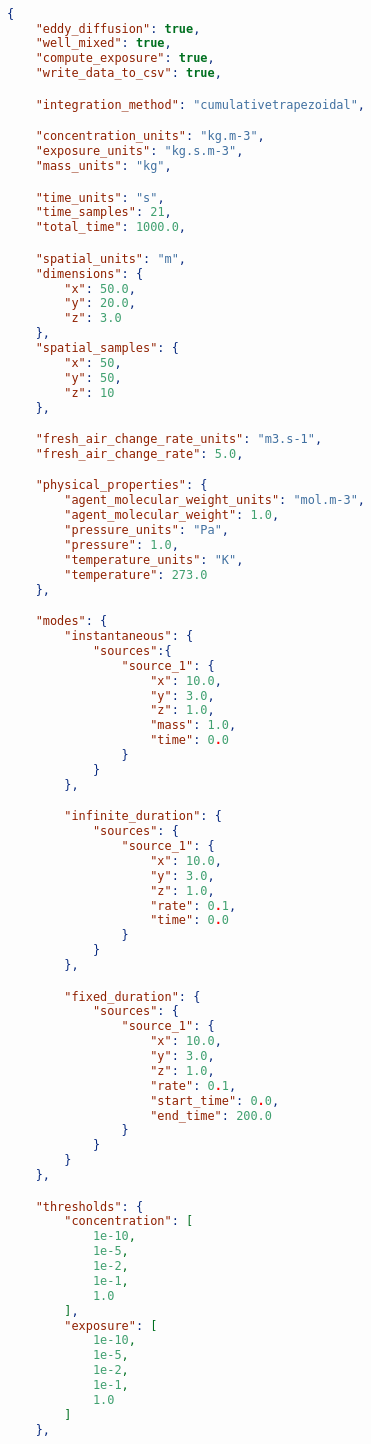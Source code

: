 \begin{lstlisting}[language=json,firstnumber=1]

{
    "eddy_diffusion": true,
    "well_mixed": true,
    "compute_exposure": true,
    "write_data_to_csv": true,

    "integration_method": "cumulativetrapezoidal",

    "concentration_units": "kg.m-3",
    "exposure_units": "kg.s.m-3",
    "mass_units": "kg",

    "time_units": "s",
    "time_samples": 21,
    "total_time": 1000.0,

    "spatial_units": "m",
    "dimensions": {
        "x": 50.0,
        "y": 20.0,
        "z": 3.0
    },
    "spatial_samples": {
        "x": 50,
        "y": 50,
        "z": 10 
    },

    "fresh_air_change_rate_units": "m3.s-1",
    "fresh_air_change_rate": 5.0,

    "physical_properties": {
        "agent_molecular_weight_units": "mol.m-3",
        "agent_molecular_weight": 1.0,
        "pressure_units": "Pa",
        "pressure": 1.0,
        "temperature_units": "K",
        "temperature": 273.0
    },

    "modes": {
        "instantaneous": {
            "sources":{
                "source_1": {
                    "x": 10.0,
                    "y": 3.0,
                    "z": 1.0,
                    "mass": 1.0,
                    "time": 0.0
                }
            }
        },

        "infinite_duration": {
            "sources": {
                "source_1": {
                    "x": 10.0,
                    "y": 3.0,
                    "z": 1.0,
                    "rate": 0.1,
                    "time": 0.0
                }
            }
        },

        "fixed_duration": {
            "sources": {
                "source_1": {
                    "x": 10.0,
                    "y": 3.0,
                    "z": 1.0,
                    "rate": 0.1,
                    "start_time": 0.0, 
                    "end_time": 200.0
                }
            }
        }
    },

    "thresholds": {
        "concentration": [
            1e-10,
            1e-5,
            1e-2,
            1e-1,
            1.0
        ],
        "exposure": [
            1e-10,
            1e-5,
            1e-2,
            1e-1,
            1.0
        ]
    },


\end{lstlisting}
